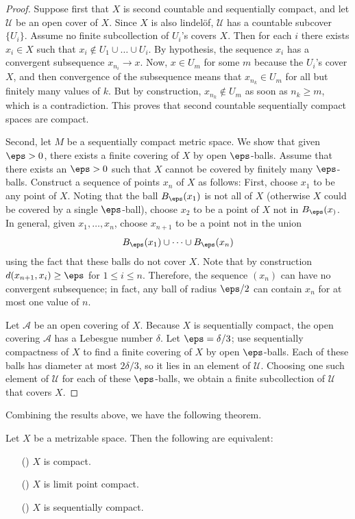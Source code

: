 \begin{proof}
Suppose first that $X$ is second countable and sequentially compact, and let $\mathcal{U}$ be an open cover of $X$. Since $X$ is also lindel\"of, $\mathcal{U}$ has a countable subcover $\{U_i\}$. Assume no finite subcollection of $U_i$'s covers $X$. Then for each $i$ there exists $x_i\in X$ such that $x_i\notin U_1\cup\dots\cup U_i$. By hypothesis, the sequence $x_i$ has a convergent subsequence $x_{n_i}\to x$. Now, $x\in U_m$ for some $m$ because the $U_i$'s cover $X$, and then convergence of the subsequence means that $x_{n_k}\in U_m$ for all but finitely many values of $k$. But by construction, $x_{n_k}\notin U_m$ as soon as $n_k\geq m$, which is a contradiction. This proves that second countable sequentially compact spaces are compact.\par
Second, let $M$ be a sequentially compact metric space. We show that given $\eps>0$, there exists a finite covering of $X$ by open $\eps$-balls. Assume that there exists an $\eps>0$ such that $X$ cannot be covered by finitely many $\eps$-balls. Construct a sequence of points $x_n$ of $X$ as follows: First, choose $x_1$ to be any point of $X$. Noting that the ball $B_{\eps}(x_1)$ is not all of $X$ (otherwise $X$ could be covered by a single $\eps$-ball), choose $x_2$ to be a point of $X$ not in $B_{\eps}(x_)$. In general, given $x_1,\dots,x_n$, choose $x_{n+1}$ to be a point not in the union 
\[B_{\eps}(x_1)\cup\cdots\cup B_{\eps}(x_n)\]
using the fact that these balls do not cover $X$. Note that by construction $d(x_{n+1},x_i)\geq\eps$ for $1\leq i\leq n$. Therefore, the sequence $(x_n)$ can have no convergent subsequence; in fact, any ball of radius $\eps/2$ can contain $x_n$ for at most one value of $n$.\par
Let $\mathcal{A}$ be an open covering of $X$. Because $X$ is sequentially compact, the open covering $\mathcal{A}$ has a Lebesgue number $\delta$. Let $\eps=\delta/3$; use sequentially compactness of $X$ to find a finite covering of $X$ by open $\eps$-balls. Each of these balls has diameter at most $2\delta/3$, so it lies in an element of $\mathcal{U}$. Choosing one such element of $\mathcal{U}$ for each of these $\eps$-balls, we obtain a finite subcollection of $\mathcal{U}$ that covers $X$.
\end{proof}
Combining the results above, we have the following theorem.
\begin{theorem}
Let $X$ be a metrizable space. Then the following are equivalent:
\begin{itemize}
\item[(\rmnum{1})] $X$ is compact.
\item[(\rmnum{2})] $X$ is limit point compact.
\item[(\rmnum{3})] $X$ is sequentially compact.
\end{itemize}
\end{theorem}
